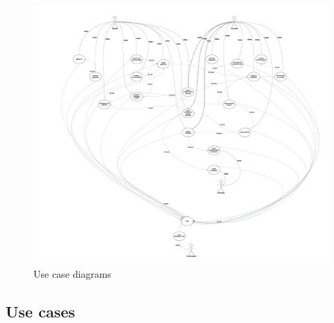 \begin{figure}[H]
    \centering
    \includegraphics[width=1\linewidth]{RASD//Images/usecase.png}
    \caption{Use case diagrams}
    \label{fig:enter-label}
\end{figure}

\pagebreak
\subsection{Use cases}



